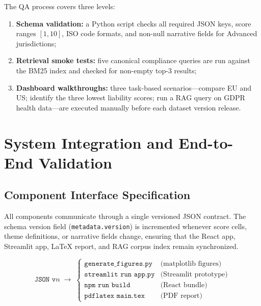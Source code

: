 The QA process covers three levels:

\begin{enumerate}[noitemsep]
  \item \textbf{Schema validation:} a Python script checks all required JSON keys,
        score ranges $[1,10]$, ISO code formats, and non-null narrative fields for
        Advanced jurisdictions;
  \item \textbf{Retrieval smoke tests:} five canonical compliance queries are run
        against the BM25 index and checked for non-empty top-3 results;
  \item \textbf{Dashboard walkthroughs:} three task-based scenarios---compare EU and
        US; identify the three lowest liability scores; run a RAG query on GDPR health
        data---are executed manually before each dataset version release.
\end{enumerate}

\section{System Integration and End-to-End Validation}
\label{sec:integration}

\subsection{Component Interface Specification}
\label{sec:interfaces}

All components communicate through a single versioned JSON contract. The schema
version field (\texttt{metadata.version}) is incremented whenever score cells, theme
definitions, or narrative fields change, ensuring that the React app, Streamlit app,
LaTeX report, and RAG corpus index remain synchronized.

\begin{equation}
\label{eq:version}
\texttt{JSON v}n \;\longrightarrow\;
\begin{cases}
\texttt{generate\_figures.py} & \text{(matplotlib figures)} \\
\texttt{streamlit run app.py} & \text{(Streamlit prototype)} \\
\texttt{npm run build} & \text{(React bundle)} \\
\texttt{pdflatex main.tex} & \text{(PDF report)}
\end{cases}
\end{equation}

